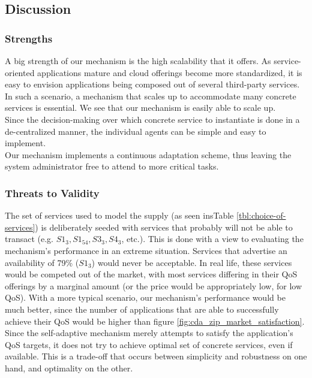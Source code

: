 \documentclass[10pt,journal,compsoc]{IEEEtran}
\begin{document}
\subsection{Discussion}
\subsubsection{Strengths}
A big strength of our mechanism is the high scalability that it offers. As service-oriented applications mature and cloud offerings become more standardized, it is easy to envision applications being composed out of several third-party services. In such a scenario, a mechanism that scales up to accommodate many concrete services is essential. We see that our mechanism is easily able to scale up.\\
Since the decision-making over which concrete service to instantiate is done in a de-centralized manner, the individual agents can be simple and easy to implement. \\    
Our mechanism implements a continuous adaptation scheme, thus leaving the system administrator free to attend to more critical tasks.

\subsubsection{Threats to Validity}

The set of services used to model the supply (as seen insTable \ref{tbl:choice-of-services}) is deliberately seeded with services that probably will not be able to transact (e.g. $S1_{3}, S1_{54}, S3_{3}, S4_{3}$, etc.). This is done with a view to evaluating the mechanism's performance in an extreme situation. Services that advertise an availability of 79\% ($S1_{3}$) would never be acceptable.  In real life, these services would be competed out of the market, with most services differing in their QoS offerings by a marginal amount (or the price would be appropriately low, for low QoS). With a more typical scenario, our mechanism's performance would be much better, since the number of applications that are able to successfully achieve their QoS would be higher than figure \ref{fig:cda_zip_market_satisfaction}. Since the self-adaptive mechanism merely attempts to satisfy the application's QoS targets, it does not try to achieve  optimal set of concrete services, even if available. This is a trade-off that occurs between simplicity and robustness on one hand, and optimality on the other.\\
\end{document}
